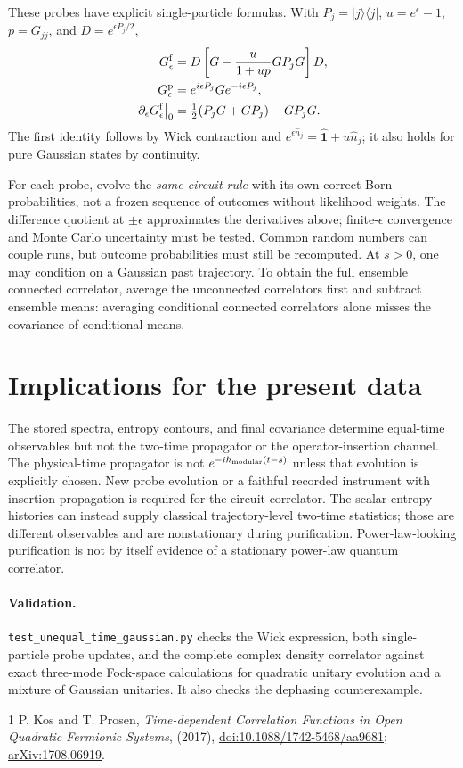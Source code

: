 \documentclass[aps,prb,onecolumn,nofootinbib,superscriptaddress]{revtex4-2}
\begin{document}
These probes have explicit single-particle formulas. With
$P_j=|j\rangle\langle j|$, $u=e^\epsilon-1$, $p=G_{jj}$, and
$D=e^{\epsilon P_j/2}$,
\begin{align}
G^{\rm f}_\epsilon
 &=D\left[G-\frac{u}{1+up}GP_jG\right]D,\\
G^{\rm p}_\epsilon&=e^{i\epsilon P_j}G e^{-i\epsilon P_j},\\
\left.\partial_\epsilon G^{\rm f}_\epsilon\right|_0
 &=\tfrac12(P_jG+GP_j)-GP_jG.
\end{align}
The first identity follows by Wick contraction and
$e^{\epsilon\hat n_j}=\hat{\mathbf 1}+u\hat n_j$; it also holds for pure
Gaussian states by continuity.

For each probe, evolve the \emph{same circuit rule} with its own correct Born
probabilities, not a frozen sequence of outcomes without likelihood weights.
The difference quotient at $\pm\epsilon$ approximates the derivatives above;
finite-$\epsilon$ convergence and Monte Carlo uncertainty must be tested.
Common random numbers can couple runs, but outcome probabilities must still
be recomputed. At $s>0$, one may condition on a Gaussian past trajectory.
To obtain the full ensemble connected correlator, average the unconnected
correlators first and subtract ensemble means: averaging conditional connected
correlators alone misses the covariance of conditional means.

\section{Implications for the present data}
The stored spectra, entropy contours, and final covariance determine equal-time
observables but not the two-time propagator or the operator-insertion channel.
The physical-time propagator is not $e^{-i h_{\rm modular}(t-s)}$ unless that
evolution is explicitly chosen. New probe evolution or a faithful recorded
instrument with insertion propagation is required for the circuit correlator.
The scalar entropy histories can instead supply classical trajectory-level
two-time statistics; those are different observables and are nonstationary
during purification. Power-law-looking purification is not by itself evidence
of a stationary power-law quantum correlator.

\paragraph{Validation.}
\texttt{test\_unequal\_time\_gaussian.py} checks the Wick expression, both
single-particle probe updates, and the complete complex density correlator
against exact three-mode Fock-space calculations for quadratic unitary evolution
and a mixture of Gaussian unitaries. It also checks the dephasing counterexample.

\begin{thebibliography}{1}
 P. Kos and T. Prosen,
\emph{Time-dependent Correlation Functions in Open Quadratic Fermionic Systems},
(2017),
\href{https://doi.org/10.1088/1742-5468/aa9681}{doi:10.1088/1742-5468/aa9681};
\href{https://arxiv.org/abs/1708.06919}{arXiv:1708.06919}.
\end{thebibliography}
\end{document}
